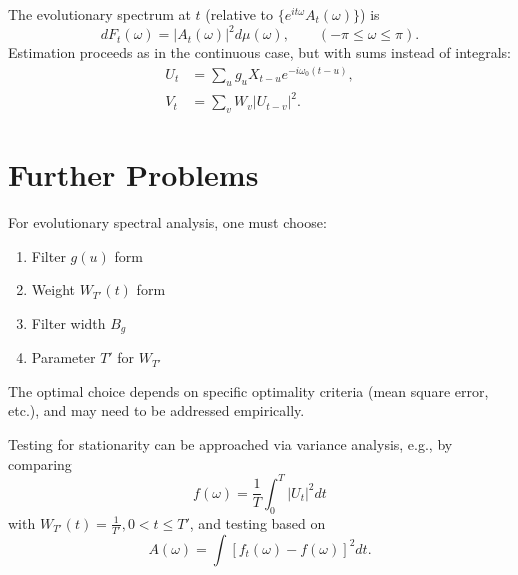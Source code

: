 \documentclass[12pt]{article}
\theoremstyle{definition}
\theoremstyle{plain}
\theoremstyle{remark}
\begin{document}
The evolutionary spectrum at $t$ (relative to $\{e^{i t \omega} A_t(\omega)\}$) is
\begin{equation}
dF_t(\omega) = |A_t(\omega)|^2 d\mu(\omega), \qquad (-\pi \leq \omega \leq \pi).
\end{equation}
Estimation proceeds as in the continuous case, but with sums instead of integrals:
\begin{align}
U_t &= \sum_u g_u X_{t-u} e^{-i\omega_0 (t-u)},\\
V_t &= \sum_v W_{v} |U_{t-v}|^2. 
\end{align}

\section{Further Problems}
\label{sec:further}

For evolutionary spectral analysis, one must choose:
\begin{enumerate}[label=(\arabic*)]
    \item Filter $g(u)$ form
    \item Weight $W_{T'}(t)$ form
    \item Filter width $B_g$
    \item Parameter $T'$ for $W_{T'}$
\end{enumerate}
The optimal choice depends on specific optimality criteria (mean square error, etc.), and may need to be addressed empirically.

Testing for stationarity can be approached via variance analysis, e.g., by comparing
\begin{equation}
f(\omega) = \frac{1}{T} \int_0^T |U_t|^2 dt
\end{equation}
with $W_{T'}(t) = \frac{1}{T'}, 0 < t \leq T'$, and testing based on
\begin{equation}
A(\omega) = \int [f_t(\omega) - f(\omega)]^2 dt.
\end{equation}
\end{document}
